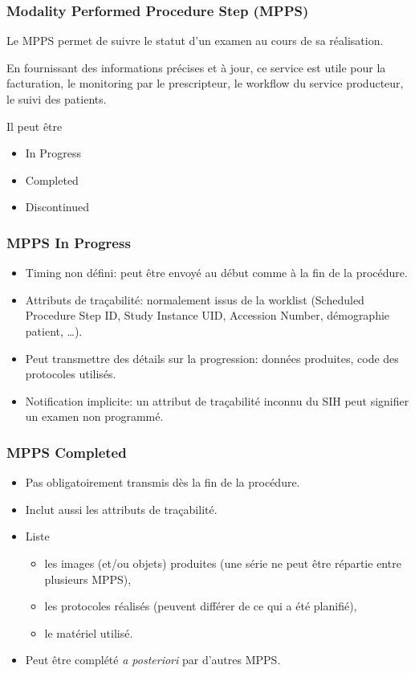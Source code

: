 	\frame
	{
		\frametitle{Modality Performed Procedure Step (MPPS)}
		Le MPPS permet de suivre le statut d'un examen au cours de sa r\'ealisation.

        En fournissant des informations pr\'ecises et \`a jour, ce service est utile pour la facturation, le monitoring par le prescripteur, le workflow du service producteur, le suivi des patients.

		Il peut \^etre 
		\begin{itemize}
			\item<2-> In Progress
			\item<3-> Completed
			\item<4-> Discontinued
		\end{itemize}
	}
	
	\frame
	{
		\frametitle{MPPS In Progress}
		\begin{itemize}
			\item Timing non d\'efini: peut \^etre envoy\'e au d\'ebut comme \`a la fin de la proc\'edure.
			\item<2-> Attributs de tra\c cabilit\'e: normalement issus de la worklist (Scheduled Procedure Step ID, Study Instance UID, Accession Number, d\'emographie patient, \ldots).
			\item<3-> Peut transmettre des d\'etails sur la progression: donn\'ees produites, code des protocoles utilis\'es.
			\item<4-> Notification implicite: un attribut de tra\c cabilit\'e inconnu du SIH peut signifier un examen non programm\'e.
		\end{itemize}
	}
	
	\frame
	{
		\frametitle{MPPS Completed}
		\begin{itemize}
			\item Pas obligatoirement transmis d\`es la fin de la proc\'edure.
			\item<2-> Inclut aussi les attributs de tra\c cabilit\'e.
			\item<3-> Liste
			\begin{itemize}
				\item<4-> les images (et/ou objets) produites (une s\'erie ne peut \^etre r\'epartie entre plusieurs MPPS),
				\item<5-> les protocoles r\'ealis\'es (peuvent diff\'erer de ce qui a \'et\'e planifi\'e),
				\item<6-> le mat\'eriel utilis\'e.
			\end{itemize}
			\item<7-> Peut \^etre compl\'et\'e \emph{a posteriori} par d'autres MPPS.
		\end{itemize}
	}
		
